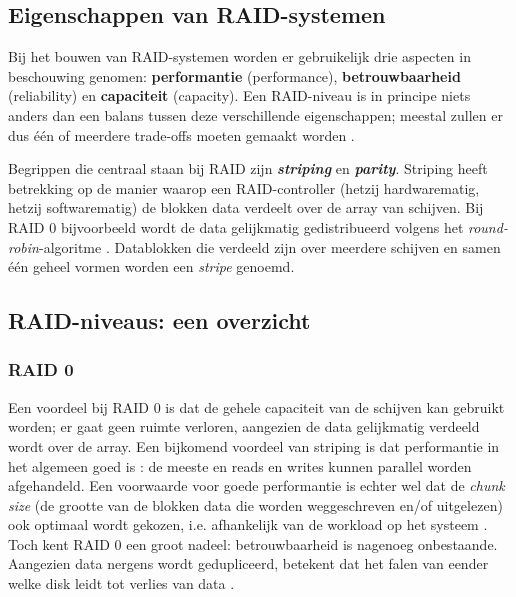 \subsection{Eigenschappen van RAID-systemen}

Bij het bouwen van RAID-systemen worden er gebruikelijk drie aspecten in beschouwing genomen: \textbf{\gls{performantie}} (performance), \textbf{\gls{betrouwbaarheid}} (reliability) en \textbf{\gls{capaciteit}} (capacity). Een RAID-niveau is in principe niets anders dan een balans tussen deze verschillende eigenschappen; meestal zullen er dus één of meerdere trade-offs moeten gemaakt worden \autocite{Chen1994}.

Begrippen die centraal staan bij RAID zijn \textit{\textbf{\gls{striping}}} en \textit{\textbf{\gls{parity}}}. Striping heeft betrekking op de manier waarop een RAID-controller (hetzij hardwarematig, hetzij softwarematig) de blokken data verdeelt over de array van schijven. Bij RAID 0 bijvoorbeeld wordt de data gelijkmatig gedistribueerd volgens het \textit{\gls{round-robin}}-algoritme \autocite{OSThreePiecesRemzi2015}. Datablokken die verdeeld zijn over meerdere schijven en samen één geheel vormen worden een \textit{stripe} genoemd. \\ 

\subsection{RAID-niveaus: een overzicht}

\subsubsection{RAID 0}

Een voordeel bij RAID 0 is dat de gehele \gls{capaciteit} van de schijven kan gebruikt worden; er gaat geen ruimte verloren, aangezien de data gelijkmatig verdeeld wordt over de array. Een bijkomend voordeel van striping is dat \gls{performantie} in het algemeen goed is \autocite{OSThreePiecesRemzi2015} : de meeste en reads en writes kunnen parallel worden afgehandeld. Een voorwaarde voor goede \gls{performantie} is echter wel dat de \textit{chunk size} (de grootte van de blokken data die worden weggeschreven en/of uitgelezen) ook optimaal wordt gekozen, i.e. afhankelijk van de workload op het systeem \autocite{OSThreePiecesRemzi2015}. Toch kent RAID 0 een groot nadeel: \gls{betrouwbaarheid} is nagenoeg onbestaande. Aangezien data nergens wordt gedupliceerd, betekent dat het falen van eender welke disk leidt tot verlies van data \autocite{OSThreePiecesRemzi2015}.

